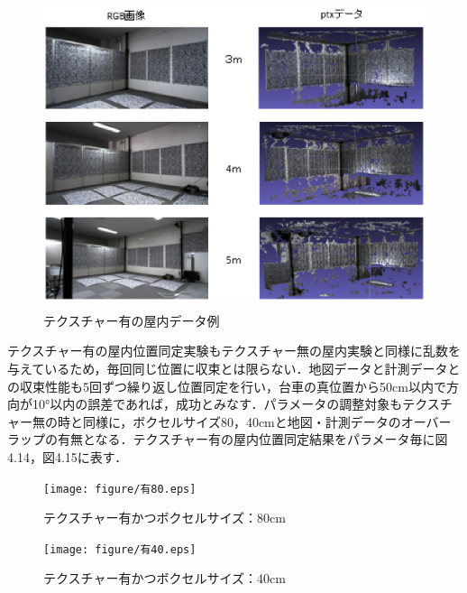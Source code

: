 \begin{figure}[htbp]
  \begin{center}
   \includegraphics[height=90mm]{figure/テクスチャー有の屋内データ例.eps}
   \caption{テクスチャー有の屋内データ例}
   \label{テクスチャー有の屋内データ例}
  \end{center}
\end{figure}

\vspace{10mm}
テクスチャー有の屋内位置同定実験もテクスチャー無の屋内実験と同様に乱数を与えているため，毎回同じ位置に収束とは限らない．地図データと計測データとの収束性能も5回ずつ繰り返し位置同定を行い，台車の真位置から50cm以内で方向が10°以内の誤差であれば，成功とみなす．パラメータの調整対象もテクスチャー無の時と同様に，ボクセルサイズ80，40cmと地図・計測データのオーバーラップの有無となる．テクスチャー有の屋内位置同定結果をパラメータ毎に図4.14，図4.15に表す．

%
\begin{figure}[htbp]
  \begin{center}
   \texttt{[image: figure/有80.eps]}
   \caption{テクスチャー有かつボクセルサイズ：80cm}
   \label{80-0}
  \end{center}
\end{figure}
%

%
\begin{figure}[htbp]
  \begin{center}
   \texttt{[image: figure/有40.eps]}
   \caption{テクスチャー有かつボクセルサイズ：40cm}
   \label{80-1}
  \end{center}
\end{figure}
%

\newpage


